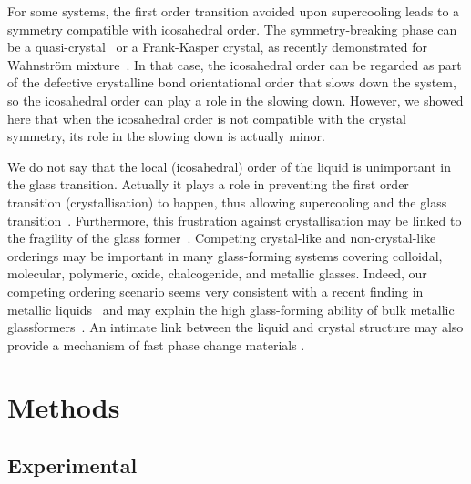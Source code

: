 For some systems, the first order transition avoided upon supercooling leads to a symmetry compatible with icosahedral order. The symmetry-breaking phase can be a quasi-crystal~\citep{Doye2003} or a Frank-Kasper crystal, as recently demonstrated for Wahnstr\"om mixture~\citep{Pedersen2010}. In that case, the icosahedral order can be regarded as part of the defective crystalline bond orientational order that slows down the system, so the icosahedral order can play a role in the slowing down. However, we showed here that when the icosahedral order is not compatible with the crystal symmetry, its role in the slowing down is actually minor.

We do not say that the local (icosahedral) order of the liquid is unimportant in the glass transition. Actually it plays a role in preventing the first order transition (crystallisation) to happen, thus allowing supercooling and the glass transition~\cite{TanakaMJPCM}. Furthermore, this frustration against crystallisation may be linked to the fragility of the glass former~\citep{TanakaGJPCM,tanaka2010critical}. Competing crystal-like and non-crystal-like orderings may be important in many glass-forming systems covering colloidal, molecular, polymeric, oxide, chalcogenide, and metallic glasses. Indeed, our competing ordering scenario seems very consistent with a recent finding in metallic liquids~\cite{liu2010metallic} and may explain the high glass-forming ability of bulk metallic glassformers~\cite{Wang2004}. An intimate link between the liquid and crystal structure may also provide a mechanism of fast phase change materials \cite{wuttig2007phase}.

\section*{Methods}

\subsection*{Experimental}

